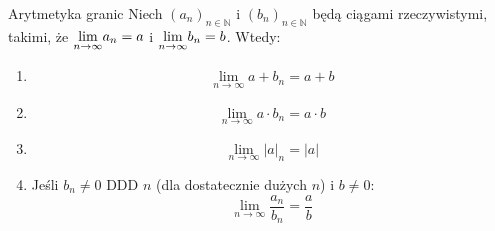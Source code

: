 \documentclass{article}
\newcommand{\N}{\mathbb{N}}
\newcommand{\oo}{\infty}
\newcommand{\ciag}[1]{(#1_{n})_{n \in \N}}
\newcommand{\gras}[2]{\lim_{#1 \to \oo} #2_{#1}}
\newcommand{\lgras}[2]{\mathlarger{\lim}_{#1 \to \oo} #2_{#1}}
\begin{document}
    \begin{twier}{Arytmetyka granic}
        Niech $\ciag{a}$ i $\ciag{b}$ będą ciągami rzeczywistymi, takimi, że $\lgras{n}{a} = a$ i $\lgras{n}{b} = b$. Wtedy:
        \begin{enumerate}
            \item \begin{equation}
                \gras{n}{a + b} = a + b
            \end{equation} 
            \item \begin{equation}
                \gras{n}{a \cdot b} = a \cdot b
            \end{equation} 
            \item \begin{equation}
                \gras{n}{|a|} = |a|
            \end{equation} 
            \item Jeśli $b_n \neq 0$ DDD $n$ (dla dostatecznie dużych $n$) i $b \neq 0$:
            \begin{equation}
                \lim_{n \to \oo} \frac{a_n}{b_n} = \frac{a}{b}
            \end{equation} 
            
        \end{enumerate}
    \end{twier}
\end{document}
